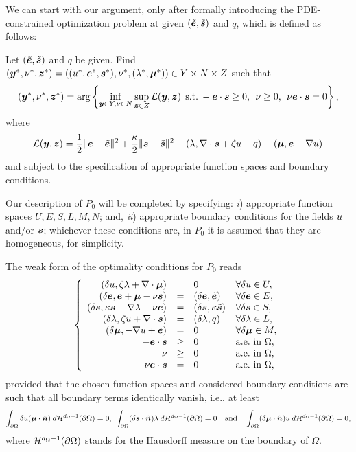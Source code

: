 We can start with our argument, only after formally introducing the PDE-constrained optimization problem at given $(\eFt,\sFt)$ and $q$, which is defined as follows:  
\begin{problem}[$P_0$]
Let $(\eFt,\sFt)$ and $q$ be given. Find $(\yF^*,\nu^*,\zF^*) = ((\uF^*,\eF^*,\sF^*),\nu^*,(\lF^*,\mF^*))\in Y \times N \times Z$ such that
    \begin{equation}
        (\yF^*,\nu^*,\zF^*) =\arg\left\lbrace
        \inf_{\yF\in Y, \nu\in N}\sup_{\zF \in Z}
        \mathcal{L}(\yF,\zF)
        \:\:\mathrm{s.t.}\:
        -\eF\cdot\sF\geq0,\:\:\nu\geq 0,\:\: \nu\eF\cdot\sF = 0
        \right\rbrace,
    \end{equation}
where
$$
\mathcal{L}(\yF,\zF) =         \frac12\norm[]{\eF-\eFt}^2+\frac{\kappa}{2}\norm[]{\sF-\sFt}^2+\iprod[]{\lF}{\nabla\cdot\sF+\zeta\uF-q}+\iprod[]{\mF}{\eF-\nabla\uF}
$$
and subject to the specification of appropriate function spaces and boundary conditions.
\end{problem}

\begin{remark}
Our description
of 
$P_0$ will be completed by specifying: \textit{i}) appropriate function spaces $U,E,S,L,M,N$; and, \textit{ii}) appropriate boundary conditions for the fields $\uF$ and/or $\sF$; whichever these conditions are, in $P_0$ it is assumed that they are homogeneous, for simplicity.  
\end{remark}
%
The weak form of the optimality conditions for $P_0$ reads
\begin{equation}
\left\lbrace
\begin{array}{rcll}
    \iprod[]{\delta\uF}{\zeta\lF+\nabla\cdot\mF} &=& 0                                & \forall \delta\uF\in U,\\
    \iprod[]{\delta\eF}{\eF+\mF-\nu\sF}                 &=& \iprod[]{\delta\eF}{\eFt}       & \forall \delta\eF\in E,\\   
    \iprod[]{\delta\sF}{\kappa\sF-\nabla\lF-\nu\eF}     &=& \iprod[]{\delta\sF}{\kappa\sFt} & \forall \delta\sF\in S,\\
    \iprod[]{\delta\lF}{\zeta\uF+\nabla\cdot\sF} &=& \iprod[]{\delta\lF}{q}          & \forall \delta\lF\in L,\\
    \iprod[]{\delta\mF}{-\nabla\uF+\eF}          &=& 0                            & \forall \delta\mF\in M,\\
    -\eF\cdot\sF &\geq& 0 &\mathrm{a.e.}\IN\Omega,\\
    \nu &\geq& 0 & \mathrm{a.e.}\IN\Omega,\\
    \nu\eF\cdot\sF &=& 0 &\mathrm{a.e.}\IN\Omega,
\end{array}
\right.    
\end{equation}
provided that the chosen function spaces and considered boundary conditions are such that all boundary terms identically vanish, i.e., at least
$$
\int_{\partial \Omega}\delta\uF (\mF\cdot\normal)\: d\measbd = 0,
\:\:
\int_{\partial \Omega}(\delta \sF\cdot\normal)\lF\: d\measbd = 0
\quad\text{and}\quad
\int_{\partial \Omega}(\delta\mF\cdot\normal)\uF\: d\measbd = 0,
$$
where $\measbd$ stands for the Hausdorff measure on the boundary of $\Omega$.

